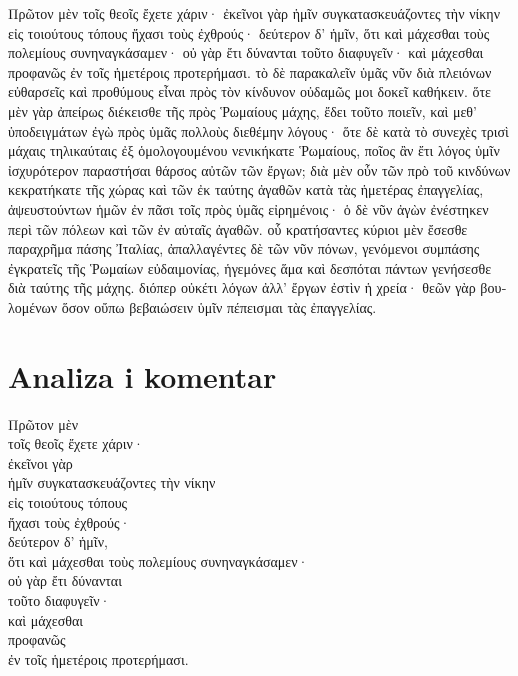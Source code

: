 \medskip

{\large
\begin{greek}
\noindent Πρῶτον μὲν τοῖς θεοῖς ἔχετε χάριν· ἐκεῖνοι γὰρ ἡμῖν συγκατασκευάζοντες τὴν νίκην εἰς τοιούτους τόπους ἤχασι τοὺς ἐχθρούς· δεύτερον δ' ἡμῖν, ὅτι καὶ μάχεσθαι τοὺς πολεμίους συνηναγκάσαμεν· οὐ γὰρ ἔτι δύνανται τοῦτο διαφυγεῖν· καὶ μάχεσθαι προφανῶς ἐν τοῖς ἡμετέροις προτερήμασι. τὸ δὲ παρακαλεῖν ὑμᾶς νῦν διὰ πλειόνων εὐθαρσεῖς καὶ προθύμους εἶναι πρὸς τὸν κίνδυνον οὐδαμῶς μοι δοκεῖ καθήκειν. ὅτε μὲν γὰρ ἀπείρως διέκεισθε τῆς πρὸς Ῥωμαίους μάχης, ἔδει τοῦτο ποιεῖν, καὶ μεθ' ὑποδειγμάτων ἐγὼ πρὸς ὑμᾶς πολλοὺς διεθέμην λόγους· ὅτε δὲ κατὰ τὸ συνεχὲς τρισὶ μάχαις τηλικαύταις ἐξ ὁμολογουμένου νενικήκατε Ῥωμαίους, ποῖος ἂν ἔτι λόγος ὑμῖν ἰσχυρότερον παραστήσαι θάρσος αὐτῶν τῶν ἔργων; διὰ μὲν οὖν τῶν πρὸ τοῦ κινδύνων κεκρατήκατε τῆς χώρας καὶ τῶν ἐκ ταύτης ἀγαθῶν κατὰ τὰς ἡμετέρας ἐπαγγελίας, ἀψευστούντων ἡμῶν ἐν πᾶσι τοῖς πρὸς ὑμᾶς εἰρημένοις· ὁ δὲ νῦν ἀγὼν ἐνέστηκεν περὶ τῶν πόλεων καὶ τῶν ἐν αὐταῖς ἀγαθῶν. οὗ κρατήσαντες κύριοι μὲν ἔσεσθε παραχρῆμα πάσης Ἰταλίας, ἀπαλλαγέντες δὲ τῶν νῦν πόνων, γενόμενοι συμπάσης ἐγκρατεῖς τῆς Ῥωμαίων εὐδαιμονίας, ἡγεμόνες ἅμα καὶ δεσπόται πάντων γενήσεσθε διὰ ταύτης τῆς μάχης. διόπερ οὐκέτι λόγων ἀλλ' ἔργων ἐστὶν ἡ χρεία· θεῶν γὰρ βουλομένων ὅσον οὔπω βεβαιώσειν ὑμῖν πέπεισμαι τὰς ἐπαγγελίας.

\end{greek}
}

\newpage

\section*{Analiza i komentar}


{\large
\begin{greek}
\noindent Πρῶτον μὲν \\
\tabto{2em} τοῖς θεοῖς ἔχετε χάριν·\\
\tabto{4em} ἐκεῖνοι γὰρ \\
\tabto{6em} ἡμῖν συγκατασκευάζοντες τὴν νίκην \\
\tabto{4em} εἰς τοιούτους τόπους \\
\tabto{4em} ἤχασι τοὺς ἐχθρούς·\\
δεύτερον δ' ἡμῖν, \\
\tabto{2em} ὅτι καὶ μάχεσθαι τοὺς πολεμίους συνηναγκάσαμεν·\\
\tabto{4em} οὐ γὰρ ἔτι δύνανται \\
\tabto{6em} τοῦτο διαφυγεῖν·\\
\tabto{2em} καὶ μάχεσθαι \\
\tabto{4em} προφανῶς \\
\tabto{8em} ἐν τοῖς ἡμετέροις προτερήμασι.\\

\end{greek}
}

